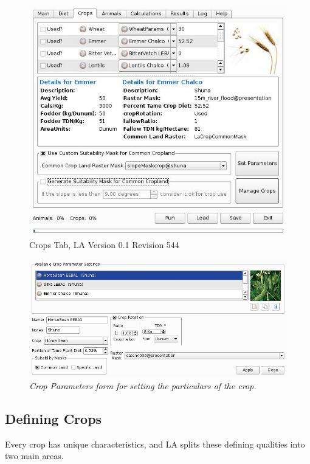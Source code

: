     \begin{figure}[htbp]
        \includegraphics[scale=.366]{./images/LanduseAnalystCrops546.jpg}
       \caption{\label{fig:crop}Crops Tab, LA Version 0.1 Revision 544}
    \end{figure}

    \begin{figure}[htbp] %
      \includegraphics[scale=.28]{./images/cropParameters.jpg}
      \caption[Crop Parameters]{\label{fig:cropParameters}\textit{Crop
        Parameters form for setting the particulars of the crop.}}
    \end{figure}

  \subsection{Defining Crops}Every crop has unique
  characteristics, and LA splits these defining qualities into two
  main areas.
